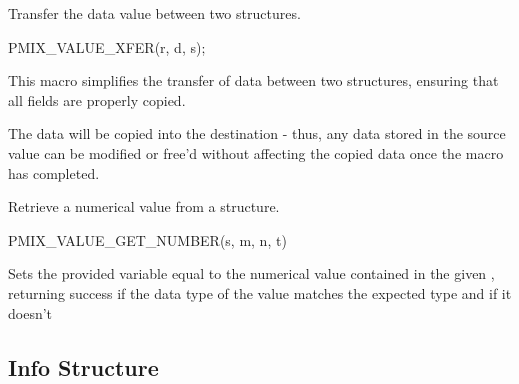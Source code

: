 Transfer the data value between two  structures.

\cspecificstart
\begin{codepar}
PMIX_VALUE_XFER(r, d, s);
\end{codepar}
\cspecificend

\begin{arglist}
\end{arglist}

This macro simplifies the transfer of data between two  structures, ensuring that all fields are properly copied.

\adviceuserstart
The data will be copied into the destination  - thus, any data stored in the source value can be modified or free'd without affecting the copied data once the macro has completed.
\adviceuserend


Retrieve a numerical value from a  structure.

\cspecificstart
\begin{codepar}
PMIX_VALUE_GET_NUMBER(s, m, n, t)
\end{codepar}
\cspecificend

\begin{arglist}
\end{arglist}

Sets the provided variable equal to the numerical value contained in the given , returning success if the data type of the value matches the expected type and  if it doesn't

\subsection{Info Structure}
\label{chap:struct:info}

